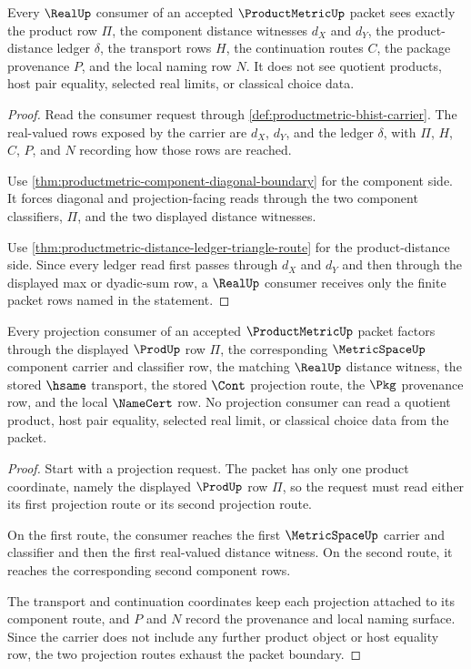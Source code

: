 \begin{theorem}
\label{thm:productmetric-realup-consumer-package}
Every $\RealUp$ consumer of an accepted $\ProductMetricUp$ packet sees exactly the product row $\Pi$, the component distance witnesses $d_X$ and $d_Y$, the product-distance ledger $\delta$, the transport rows $H$, the continuation routes $C$, the package provenance $P$, and the local naming row $N$. It does not see quotient products, host pair equality, selected real limits, or classical choice data.
\end{theorem}
\begin{proof}
Read the consumer request through \autoref{def:productmetric-bhist-carrier}. The real-valued rows exposed by the carrier are $d_X$, $d_Y$, and the ledger $\delta$, with $\Pi$, $H$, $C$, $P$, and $N$ recording how those rows are reached.

Use \autoref{thm:productmetric-component-diagonal-boundary} for the component side. It forces diagonal and projection-facing reads through the two component classifiers, $\Pi$, and the two displayed distance witnesses.

Use \autoref{thm:productmetric-distance-ledger-triangle-route} for the product-distance side. Since every ledger read first passes through $d_X$ and $d_Y$ and then through the displayed max or dyadic-sum row, a $\RealUp$ consumer receives only the finite packet rows named in the statement.
\end{proof}

\begin{theorem}
\label{thm:productmetric-projection-non-escape}
Every projection consumer of an accepted $\ProductMetricUp$ packet factors through the displayed $\ProdUp$ row $\Pi$, the corresponding $\MetricSpaceUp$ component carrier and classifier row, the matching $\RealUp$ distance witness, the stored $\hsame$ transport, the stored $\Cont$ projection route, the $\Pkg$ provenance row, and the local $\NameCert$ row. No projection consumer can read a quotient product, host pair equality, selected real limit, or classical choice data from the packet.
\end{theorem}
\begin{proof}
Start with a projection request. The packet has only one product coordinate, namely the displayed $\ProdUp$ row $\Pi$, so the request must read either its first projection route or its second projection route.

On the first route, the consumer reaches the first $\MetricSpaceUp$ carrier and classifier and then the first real-valued distance witness. On the second route, it reaches the corresponding second component rows.

The transport and continuation coordinates keep each projection attached to its component route, and $P$ and $N$ record the provenance and local naming surface. Since the carrier does not include any further product object or host equality row, the two projection routes exhaust the packet boundary.
\end{proof}

